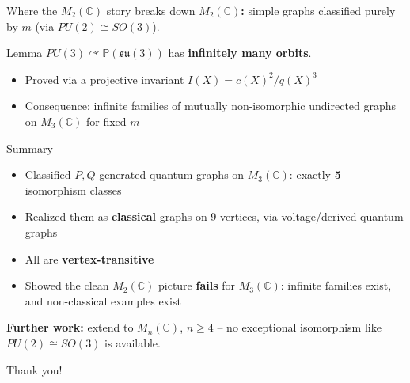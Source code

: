 \documentclass[aspectratio=169]{beamer}
\begin{document}
\begin{frame}{Where the $M_2(\mathbb{C})$ story breaks down}
    \textbf{$M_2(\mathbb{C})$:} simple graphs classified purely by $m$
    (via $PU(2) \cong SO(3)$).

    \vspace{0.5em}
    \begin{block}{Lemma}
        $PU(3) \curvearrowright \mathbb{P}(\mathfrak{su}(3))$ has
        \textbf{infinitely many orbits}.
    \end{block}
    \begin{itemize}
        \item Proved via a projective invariant $I(X) = c(X)^2/q(X)^3$
        \item Consequence: infinite families of mutually non-isomorphic
            undirected graphs on $M_3 (\mathbb{C})$ for fixed $m$
    \end{itemize}
\end{frame}

\begin{frame}{Summary}
    \begin{itemize}
        \item Classified $P,Q$-generated quantum graphs on $M_3
            (\mathbb{C})$: exactly
            \textbf{5} isomorphism classes
        \item Realized them as \textbf{classical} graphs on 9 vertices,
            via voltage/derived quantum graphs
        \item All are \textbf{vertex-transitive}
        \item Showed the clean $M_2(\mathbb{C})$ picture
            \textbf{fails} for $M_3 (\mathbb{C})$:
            infinite families exist, and non-classical examples exist
    \end{itemize}
    \vspace{0.7em}
    \textbf{Further work:} extend to $M_n(\mathbb{C})$, $n \geq 4$ --
    no exceptional
    isomorphism like $PU(2)\cong SO(3)$ is available.
\end{frame}

\begin{frame}
    \centering
    \Large Thank you!
\end{frame}
\end{document}
